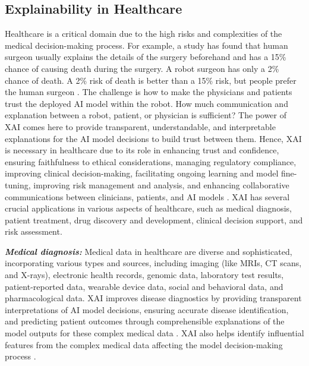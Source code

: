 \documentclass[final,5p,times,twocolumn]{elsarticle}
\begin{document}
\subsection{Explainability in Healthcare}
Healthcare is a critical domain due to the high risks and complexities of the medical decision-making process. For example, a study has found that human surgeon usually explains the details of the surgery beforehand and has a 15\% chance of causing death during the surgery. A robot surgeon has only a 2\% chance of death. A 2\% risk of death is better than a 15\% risk, but people prefer the human surgeon \cite{rudin2019we}. The challenge is how to make the physicians and patients trust the deployed AI model within the robot. How much communication and explanation between a robot, patient, or physician is sufficient? The power of XAI comes here to provide transparent, understandable, and interpretable explanations for the AI model decisions to build trust between them. Hence, XAI is necessary in healthcare due to its role in enhancing trust and confidence, ensuring faithfulness to ethical considerations, managing regulatory compliance, improving clinical decision-making, facilitating ongoing learning and model fine-tuning, improving risk management and analysis, and enhancing collaborative communications between clinicians, patients, and AI models \cite{hamamoto2021application}. 
XAI has several crucial applications in various aspects of healthcare, such as medical diagnosis, patient treatment, drug discovery and development, clinical decision support, and risk assessment.

\textbf{ \textit{Medical diagnosis:}} Medical data in healthcare are diverse and sophisticated, incorporating various types and sources, including imaging (like MRIs, CT scans, and X-rays), electronic health records, genomic data, laboratory test results, patient-reported data, wearable device data, social and behavioral data, and pharmacological data. XAI improves disease diagnostics by providing transparent interpretations of AI model decisions, ensuring accurate disease identification, and predicting patient outcomes through comprehensible explanations of the model outputs for these complex medical data \cite{albahri2023systematic, bharati2023review}. XAI also helps identify influential features from the complex medical data affecting the model decision-making process \cite{lotsch2021explainable}.
\end{document}
